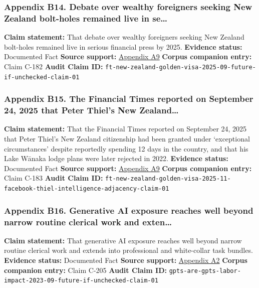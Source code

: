\documentclass[
  american,
  11pt,
  letterpaper,
]{article}
\begin{document}
\subsubsection{Appendix B14. Debate over wealthy foreigners seeking New
Zealand bolt-holes remained live in
se\ldots{}}\label{appendix-b14-debate-over-wealthy-foreigners-seeking-new-zealand-bolt-holes-remained-live-in-se}

\textbf{Claim statement:} That debate over wealthy foreigners seeking
New Zealand bolt-holes remained live in serious financial press by 2025.
\textbf{Evidence status:} Documented Fact \textbf{Source support:}
\hyperref[appendix-a9-new-zealand-woos-the-wealthy-with-golden-visa-changes]{Appendix
A9} \textbf{Corpus companion entry:} Claim C-182 \textbf{Audit Claim
ID:}
\texttt{ft-new-zealand-golden-visa-2025-09-future-if-unchecked-claim-01}

\subsubsection{Appendix B15. The Financial Times reported on September
24, 2025 that Peter Thiel's New
Zealand\ldots{}}\label{appendix-b15-the-financial-times-reported-on-september-24-2025-that-peter-thiel-s-new-zealand}

\textbf{Claim statement:} That the Financial Times reported on September
24, 2025 that Peter Thiel's New Zealand citizenship had been granted
under `exceptional circumstances' despite reportedly spending 12 days in
the country, and that his Lake Wānaka lodge plans were later rejected in
2022. \textbf{Evidence status:} Documented Fact \textbf{Source support:}
\hyperref[appendix-a9-new-zealand-woos-the-wealthy-with-golden-visa-changes]{Appendix
A9} \textbf{Corpus companion entry:} Claim C-183 \textbf{Audit Claim
ID:}
\texttt{ft-new-zealand-golden-visa-2025-11-facebook-thiel-intelligence-adjacency-claim-01}

\subsubsection{Appendix B16. Generative AI exposure reaches well beyond
narrow routine clerical work and
exten\ldots{}}\label{appendix-b16-generative-ai-exposure-reaches-well-beyond-narrow-routine-clerical-work-and-exten}

\textbf{Claim statement:} That generative AI exposure reaches well
beyond narrow routine clerical work and extends into professional and
white-collar task bundles. \textbf{Evidence status:} Documented Fact
\textbf{Source support:}
\hyperref[appendix-a2-gpts-are-gpts-an-early-look-at-the-labor-market-impact-potential-of-large-language-models]{Appendix
A2} \textbf{Corpus companion entry:} Claim C-205 \textbf{Audit Claim
ID:}
\texttt{gpts-are-gpts-labor-impact-2023-09-future-if-unchecked-claim-01}
\end{document}
